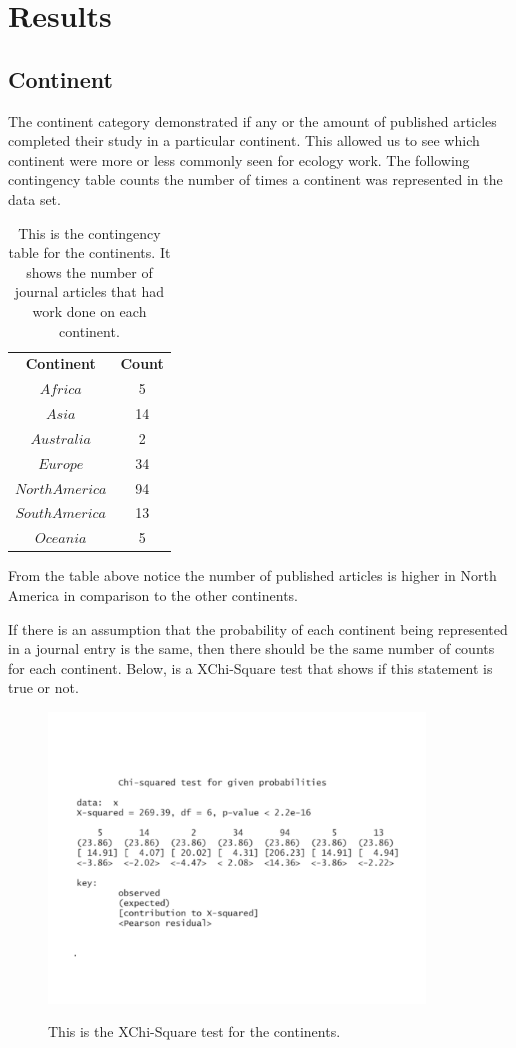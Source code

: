 \documentclass[12pt, letterpaper]{article}
\begin{document}
\section{Results}
\subsection{Continent}
The continent category demonstrated if any or the amount of published articles completed their study in a particular continent. This allowed us to see which continent were more or less commonly seen for ecology work. The following contingency table counts the number of times a continent was represented in the data set.
\begin{table}[h]
\begin{center}
\begin{tabular}{|c|c|}
\textbf{Continent} & \textbf{Count}\\
$Africa$ & 5\\
$Asia$ &  14\\
$Australia$ &  2\\
$Europe$ & 34\\
$North America$ & 94\\
$South America$ & 13\\
$Oceania$ & 5\\
\end{tabular}
\end{center}
\caption{This is the contingency table for the continents. It shows the number of journal articles that had work done on each continent.}
\label{fig: Continent Contingency Table}
\end{table}
From the table above notice the number of published articles is higher in North America in comparison to the other continents.

If there is an assumption that the probability of each continent being represented in a journal entry is the same, then there should be the same number of counts for each continent. Below, is a XChi-Square test that shows if this statement is true or not. 

\begin{figure}[h]
\begin{center}
\includegraphics[width=10cm]{ContinentChiSqaure1.pdf}
\label{fig: Continent XChi-Square}
\caption{This is the XChi-Square test for the continents.}
\end{center}
\end{figure}
\end{document}
